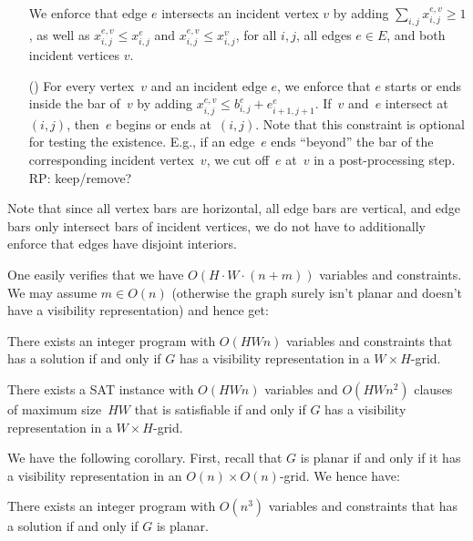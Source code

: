 \documentclass[runningheads]{llncs}
\newcommand{\comment}[1]{{\color{red} #1}}
\newcounter{constr}
\newcommand{\constr}[1]{\noindent \refstepcounter{constr}\theconstr #1}
\begin{document}
\begin{itemize}
	We enforce that edge $e$ intersects an incident vertex $v$ by adding
	$\sum_{i,j} x_{i,j}^{e,v} \geq 1$, as well as
	$x_{i,j}^{e,v} \leq x_{i,j}^e$ and $x_{i,j}^{e,v} \leq x_{i,j}^v$,
	for all $i,j$, all edges $e\in E$, and both incident vertices $v$.
\item[(\constr{\label{c:vis:eBeginEndAtV}})]
	For every vertex~$v$ and an incident edge $e$,
	we enforce that $e$ starts or ends inside the bar of~$v$
	by adding $x_{i,j}^{e,v} \leq b_{i,j}^e + e_{i+1,j+1}^e$.
	If~$v$ and~$e$ intersect at~$(i,j)$, then~$e$ begins or ends at~$(i,j)$.
	Note that this constraint is optional for testing the existence.
	E.g., if an edge~$e$ ends ``beyond'' the bar of the corresponding incident vertex~$v$,
	we cut off~$e$ at~$v$ in a post-processing step. \comment{RP: keep/remove?}
\end{itemize}
Note that since all vertex bars are horizontal, all edge bars are vertical,
and edge bars only intersect bars of incident vertices,
we do not have to additionally enforce that edges have disjoint interiors.
\par



One easily verifies that we have $O(H\cdot W\cdot (n+m))$ variables and
constraints.  We may assume $m\in O(n)$ (otherwise the graph
surely isn't planar and doesn't have a visibility representation)
and hence get:

\begin{lemma}
There exists an integer program with $O(HWn)$ variables and
constraints that has a solution if and only if $G$  has a
visibility representation in a $W\times H$-grid.
\end{lemma}
\begin{lemma}
There exists a SAT instance with $O(HWn)$ variables and
$O(HW n^2)$ 
clauses of maximum size~$HW$ that is satisfiable
if and only if $G$  has a
visibility representation in a $W\times H$-grid.
\end{lemma}
We have the following corollary.  First, recall that $G$ is planar
if and only if it has a visibility representation in an $O(n)\times O(n)$-grid.
We hence have:

\begin{corollary}
There exists an integer program with $O(n^3)$ variables and
constraints that has a solution if and only if $G$  is planar.
\end{corollary}

\fi
\end{document}
